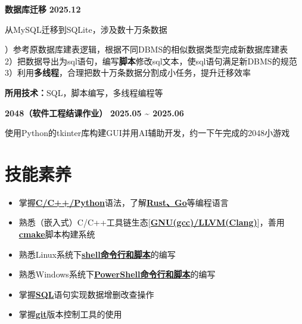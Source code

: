 \documentclass[11pt,a4paper]{ctexart}
\begin{document}
\noindent
\textcolor{sectioncolor}{\textbf{数据库迁移}} \hfill \textcolor{sectioncolor}{\textbf{2025.12}}
\par\noindent
从MySQL迁移到SQLite，涉及数十万条数据
\par{}）参考原数据库建表逻辑，根据不同DBMS的相似数据类型完成新数据库建表\\
2）把数据导出为sql语句，编写\textbf{脚本}修改sql文本，使sql语句满足新DBMS的规范\\
3）利用\textbf{多线程}，合理把数十万条数据分割成小任务，提升迁移效率
\par\noindent
\textbf{所用技术：}SQL，脚本编写，多线程编程等
\vspace{0.2em}

\noindent
\textcolor{sectioncolor}{\textbf{2048（软件工程结课作业）}} \hfill \textcolor{sectioncolor}{\textbf{2025.05 \textasciitilde{} 2025.06}}
\par\noindent
使用Python的tkinter库构建GUI并用AI辅助开发，约一下午完成的2048小游戏
\vspace{0.2em}

\section*{技能素养}
\vspace{-0.1em}
\begin{itemize}
    \item 掌握\textbf{\underline{C/C++/Python}}语法，了解\textbf{\underline{Rust、Go}}等编程语言
    \item 熟悉（嵌入式）C/C++工具链生态[\underline{\textbf{GNU(gcc)/LLVM(Clang)}}]，善用\underline{\textbf{cmake}}脚本构建系统
    \item 熟悉Linux系统下\textbf{\underline{shell命令行和脚本}}的编写
    \item 熟悉Windows系统下\textbf{\underline{PowerShell命令行和脚本}}的编写
    \item 掌握\textbf{\underline{SQL}}语句实现数据增删改查操作
    \item 掌握\textbf{\underline{git}}版本控制工具的使用
\end{itemize}
\end{document}
